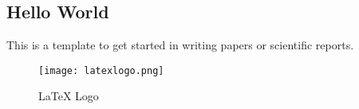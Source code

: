 \subsection{Hello World}
This is a template to get started in writing papers or scientific reports.

\begin{figure}[htb]
\centering
\texttt{[image: latexlogo.png]}
\caption{LaTeX Logo}
\label{fig:latex_logo}
\end{figure}

